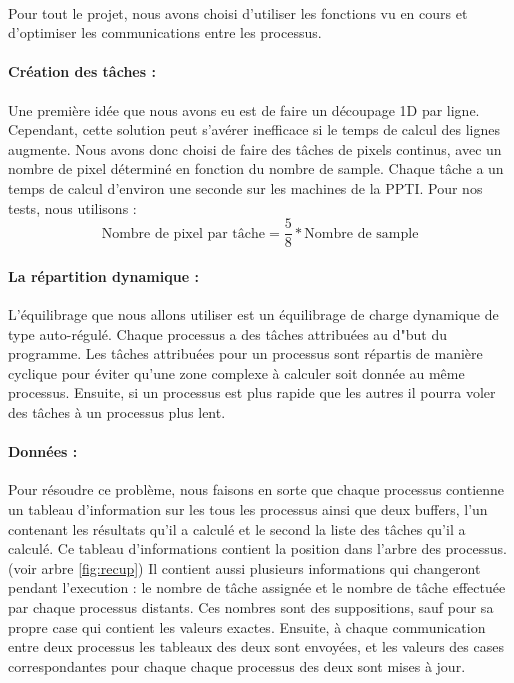 \documentclass{article}
\begin{document}
\paragraph{}
Pour tout le projet, nous avons choisi d'utiliser les fonctions vu en cours et d'optimiser les communications entre les processus.

\paragraph{Cr\'eation des t\^aches : }
Une premi\`ere id\'ee que nous avons eu est de faire un d\'ecoupage 1D par ligne. 
Cependant, cette solution peut s'av\'erer inefficace si le temps de calcul des lignes augmente.
Nous avons donc choisi de faire des t\^aches de pixels continus, avec un nombre de pixel d\'etermin\'e
en fonction du nombre de sample. Chaque t\^ache a un temps de calcul d'environ une seconde sur les machines de la PPTI. 
Pour nos tests, nous utilisons :
$$
  \text{Nombre de pixel par t\^ache} = \frac{5}{8} * \text{Nombre de sample}
$$
  
\paragraph{La r\'epartition dynamique : }
L'\'equilibrage que nous allons utiliser est un \'equilibrage de charge dynamique de type auto-r\'egul\'e.
Chaque processus a des t\^aches attribu\'ees au d"but du programme. Les t\^aches attribu\'ees pour un processus sont 
r\'epartis de manière cyclique pour \'eviter qu'une zone complexe à calculer soit donn\'ee au m\^eme processus.
Ensuite, si un processus est plus rapide que les autres il pourra voler des t\^aches \`a un processus plus lent.

\paragraph{Données : }
Pour r\'esoudre ce probl\`eme, nous faisons en sorte que chaque processus contienne un tableau d'information sur les tous les processus
ainsi que deux buffers, l'un contenant les r\'esultats qu'il a calculé et le second la liste des t\^aches qu'il a calcul\'e.
Ce tableau d'informations contient la position dans l'arbre des processus.(voir arbre \ref{fig:recup})
Il contient aussi plusieurs informations qui changeront pendant l'execution : le nombre de t\^ache assign\'ee et le nombre de t\^ache effectu\'ee par chaque processus distants.
Ces nombres sont des suppositions, sauf pour sa propre case qui contient les valeurs exactes. 
Ensuite, \`a chaque communication entre deux processus les tableaux des deux sont envoy\'ees, et les valeurs des cases correspondantes pour chaque chaque processus des deux sont mises \`a jour.
\end{document}
